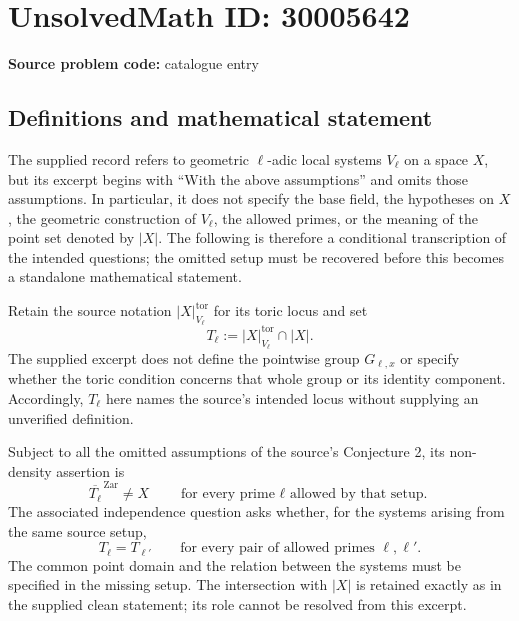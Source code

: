 \documentclass[11pt]{article}
\begin{document}
\section*{UnsolvedMath ID: 30005642}
\textbf{Source problem code:} catalogue entry
\subsection{Definitions and mathematical statement}
The supplied record refers to geometric \(\ell\)-adic local systems \(V_\ell\) on a space \(X\), but its excerpt begins with ``With the above assumptions'' and omits those assumptions. In particular, it does not specify the base field, the hypotheses on \(X\), the geometric construction of \(V_\ell\), the allowed primes, or the meaning of the point set denoted by \(|X|\). The following is therefore a conditional transcription of the intended questions; the omitted setup must be recovered before this becomes a standalone mathematical statement.

Retain the source notation \(|X|^{\mathrm{tor}}_{V_\ell}\) for its toric locus and set
\[
T_\ell:=|X|^{\mathrm{tor}}_{V_\ell}\cap |X|.
\]
The supplied excerpt does not define the pointwise group \(G_{\ell,x}\) or specify whether the toric condition concerns that whole group or its identity component. Accordingly, \(T_\ell\) here names the source's intended locus without supplying an unverified definition.

Subject to all the omitted assumptions of the source's Conjecture 2, its non-density assertion is
\[
\overline{T_\ell}^{\,\mathrm{Zar}}\ne X
\qquad\text{for every prime \(\ell\) allowed by that setup.}
\]
The associated independence question asks whether, for the systems arising from the same source setup,
\[
T_\ell=T_{\ell'}
\qquad\text{for every pair of allowed primes \(\ell,\ell'\).}
\]
The common point domain and the relation between the systems must be specified in the missing setup. The intersection with \(|X|\) is retained exactly as in the supplied clean statement; its role cannot be resolved from this excerpt.
\end{document}

